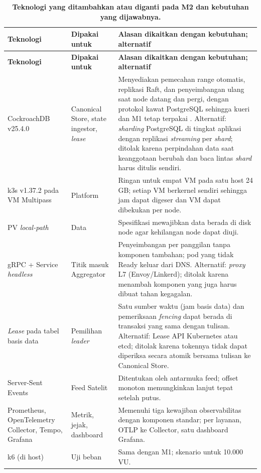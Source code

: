 \documentclass{fairmeta}
\newcommand{\code}[1]{\texttt{\detokenize{#1}}}
\begin{document}
{\footnotesize
\setlength{\tabcolsep}{4pt}
\begin{longtable}{@{}L{2.9cm}L{3.0cm}L{9.4cm}@{}}
\caption{\textbf{Teknologi yang ditambahkan atau diganti pada M2 dan kebutuhan yang dijawabnya.}}\label{tab:tech}\\
\toprule
\textbf{Teknologi} & \textbf{Dipakai untuk} & \textbf{Alasan dikaitkan dengan kebutuhan; alternatif}\\
\midrule
\endfirsthead
\toprule
\textbf{Teknologi} & \textbf{Dipakai untuk} & \textbf{Alasan dikaitkan dengan kebutuhan; alternatif}\\
\midrule
\endhead
\bottomrule
\endfoot
CockroachDB v25.4.0 & Canonical Store, state ingestor, \textit{lease} & Menyediakan pemecahan range otomatis, replikasi Raft, dan penyeimbangan ulang saat node datang dan pergi, dengan protokol kawat PostgreSQL sehingga kueri dan \code{pgx} M1 tetap terpakai \citep{cockroach-sigmod}. Alternatif: \textit{sharding} PostgreSQL di tingkat aplikasi dengan replikasi \textit{streaming} per \textit{shard}; ditolak karena perpindahan data saat keanggotaan berubah dan baca lintas \textit{shard} harus ditulis sendiri.\\
k3s v1.37.2 pada VM Multipass & Platform & Ringan untuk empat VM pada satu host 24 GB; setiap VM berkernel sendiri sehingga jam dapat digeser dan VM dapat dibekukan per node.\\
PV \textit{local-path} & Data \code{role=store} & Spesifikasi mewajibkan data berada di disk node agar kehilangan node dapat diuji.\\
gRPC \code{round_robin} + Service \textit{headless} & Titik masuk Aggregator & Penyeimbangan per panggilan tanpa komponen tambahan; pod yang tidak Ready keluar dari DNS. Alternatif: \textit{proxy} L7 (Envoy/Linkerd); ditolak karena menambah komponen yang juga harus dibuat tahan kegagalan.\\
\textit{Lease} pada tabel basis data & Pemilihan \textit{leader} & Satu sumber waktu (jam basis data) dan pemeriksaan \textit{fencing} dapat berada di transaksi yang sama dengan tulisan. Alternatif: Lease API Kubernetes atau etcd; ditolak karena tokennya tidak dapat diperiksa secara atomik bersama tulisan ke Canonical Store.\\
Server-Sent Events & Feed Satelit & Ditentukan oleh antarmuka feed; offset monoton memungkinkan lanjut tepat setelah putus.\\
Prometheus, OpenTelemetry Collector, Tempo, Grafana & Metrik, jejak, dashboard & Memenuhi tiga kewajiban observabilitas dengan komponen standar; \code{/metrics} per layanan, OTLP ke Collector, satu dashboard Grafana.\\
k6 (di host) & Uji beban & Sama dengan M1; skenario \code{ramping-vus} untuk 10.000 VU.\\
\end{longtable}
}
\end{document}
